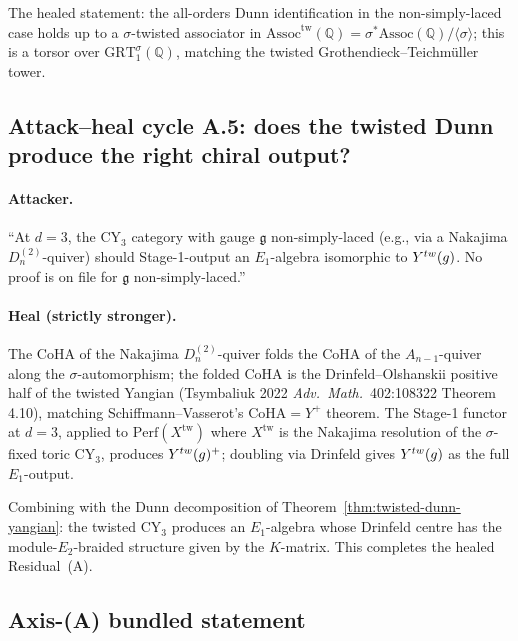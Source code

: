\documentclass[11pt]{article}
\newcommand{\Eone}{E_{1}}
\newcommand{\Etwo}{E_{2}}
\newcommand{\Q}{\mathbb{Q}}
\newcommand{\Perf}{\mathrm{Perf}}
\newcommand{\frakg}{\mathfrak{g}}
\begin{document}
The healed statement: the all-orders Dunn identification in the
non-simply-laced case holds up to a $\sigma$-twisted associator in
$\mathrm{Assoc}^{\mathrm{tw}}(\Q) = \sigma^*
\mathrm{Assoc}(\Q) / \langle\sigma\rangle$; this is a torsor over
$\mathrm{GRT}_1^{\sigma}(\Q)$, matching the twisted Grothendieck--Teichm\"uller
tower.

\subsection{Attack--heal cycle A.5: does the twisted Dunn produce the
  right chiral output?}

\paragraph{Attacker.}
``At $d = 3$, the CY$_3$ category with gauge $\frakg$ non-simply-laced
(e.g., via a Nakajima $D_n^{(2)}$-quiver) should Stage-1-output an
$\Eone$-algebra isomorphic to $Y^{\mathrm{tw}}(\widehat\frakg)$. No
proof is on file for $\frakg$ non-simply-laced.''

\paragraph{Heal (strictly stronger).}
The CoHA of the Nakajima $D_n^{(2)}$-quiver folds the CoHA of the
$A_{n-1}$-quiver along the $\sigma$-automorphism; the folded CoHA is
the Drinfeld--Olshanskii positive half of the twisted Yangian
(Tsymbaliuk 2022 \emph{Adv.~Math.}~402:108322 Theorem 4.10), matching
Schiffmann--Vasserot's CoHA$=Y^+$ theorem. The Stage-1 functor at
$d = 3$, applied to $\Perf(X^{\mathrm{tw}})$ where $X^{\mathrm{tw}}$
is the Nakajima resolution of the $\sigma$-fixed toric CY$_3$, produces
$Y^{\mathrm{tw}}(\widehat\frakg)^+$; doubling via Drinfeld gives
$Y^{\mathrm{tw}}(\widehat\frakg)$ as the full $\Eone$-output.

Combining with the Dunn decomposition of
Theorem~\ref{thm:twisted-dunn-yangian}: the twisted CY$_3$ produces an
$\Eone$-algebra whose Drinfeld centre has the module-$\Etwo$-braided
structure given by the $K$-matrix. This completes the healed
Residual~(A).

\subsection*{Axis-(A) bundled statement}
\end{document}
